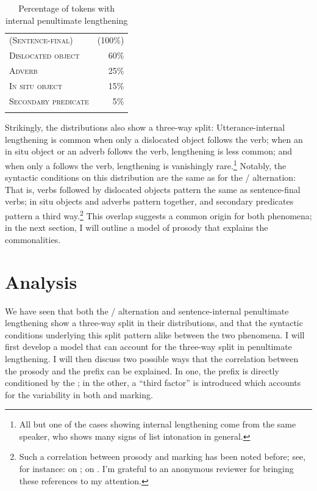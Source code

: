 \documentclass[output=paper,modfonts,nonflat,draftmode]{langsci/langscibook}
\begin{document}
\begin{table}
	\caption{Percentage of tokens with internal penultimate lengthening}
	\label{tab:kusmer:lengthening_percentages}
\begin{tabular}{lr}
	\lsptoprule
	\textsc{(Sentence-final)} & (100\%)\\
	\textsc{Dislocated object} & 60\%\\
	\midrule
	\textsc{Adverb} & 25\%\\
	\textsc{In situ object} & 15\%\\
	\midrule
	\textsc{Secondary predicate} & 5\%\\
\lspbottomrule
\end{tabular}
\end{table}

Strikingly, the distributions also show a three-way split: Utterance-internal
lengthening is common when only a dislocated object follows the verb; when an
 {in situ} object or an adverb follows the verb, lengthening is less
common; and when only a  follows the verb, lengthening is
vanishingly rare.\footnote{All but one of the  cases showing
internal lengthening come from the same speaker, who shows many signs of list
intonation in general.} Notably, the syntactic conditions on this distribution
are the same as for the \slash {} alternation: That is, verbs
followed by dislocated objects pattern the same as sentence-final verbs;
 {in situ} objects and adverbs pattern together, and secondary predicates
pattern a third way.\footnote{Such a correlation between prosody and 
marking has been noted before; see, for instance: \cite{vanderSpuy1993,
Buell2005, chengdowning2012} on ; \cite{Devos2008} on . I'm grateful
to an anonymous reviewer for bringing these references to my attention.} This
overlap suggests a common origin for both phenomena; in the next section, I
will outline a model of  prosody that explains the commonalities.

\section{Analysis}\label{sec:kusmer:analysis}

We have seen that both the \slash {} alternation and
sentence-internal penultimate lengthening show a three-way split in their
distributions, and that the syntactic conditions underlying this split pattern
alike between the two phenomena. I will first develop a model that can account
for the three-way split in penultimate lengthening. I will then discuss two
possible ways that the correlation between the prosody and the  prefix
can be explained. In one, the  prefix is directly conditioned by the
; in the other, a ``third factor'' is introduced which
accounts for the variability in both  and 
marking.
\end{document}
